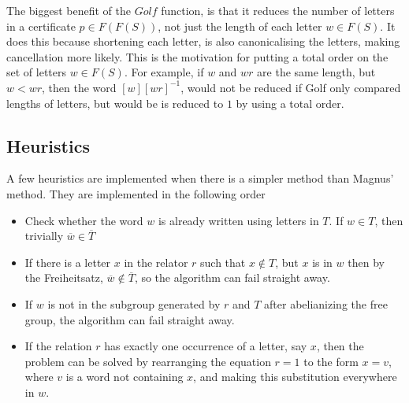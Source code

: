 \documentclass[11pt]{article} %
\theoremstyle{definition}
\theoremstyle{definition}
\theoremstyle{definition}
\theoremstyle{definition}
\theoremstyle{definition}
\theoremstyle{definition}
\begin{document}
The biggest benefit of the $Golf$ function, is that it reduces the number
of letters in a certificate $p \in F(F(S))$, not just the length of each letter
$w \in F(S)$. It does this because shortening each letter, is also
canonicalising the letters, making cancellation more likely. This is the motivation
for putting a total order on the set of letters $w \in F(S)$.
For example, if $w$ and $wr$ are the same length, but $w < wr$, then
the word $[w][wr]^{-1}$, would not be reduced if Golf only compared lengths of letters,
but would be is reduced to $1$ by using a total order.




\subsection{Heuristics}

A few heuristics are implemented when there is a simpler method than Magnus' method.
They are implemented in the following order

\begin{itemize}
  \item Check whether the word $w$ is already written using letters in $T$. If $w \in T$,
  then trivially $\overline{w} \in \overline{T}$

  \item If there is a letter $x$ in the relator $r$ such that $x \notin T$, but
  $x$ is in $w$ then by the Freiheitsatz, $\overline{w} \notin \overline{T}$,
  so the algorithm can fail straight away.

  \item If $w$ is not in the subgroup generated by $r$ and $T$ after abelianizing the free
    group, the algorithm can fail straight away.

  \item If the relation $r$ has exactly one occurrence of a letter, say $x$, then
    the problem can be solved by rearranging the equation $r = 1$ to the form
    $x = v$, where $v$ is a word not containing $x$, and making this substitution everywhere
    in $w$.
\end{itemize}
\end{document}
